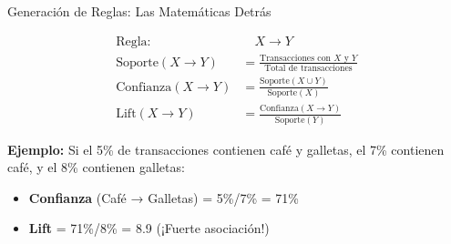 \documentclass{beamer}
\begin{document}
\begin{frame}{Generación de Reglas: Las Matemáticas Detrás}
    \centering
    \begin{tcolorbox}[
        width=0.9\textwidth,
        colback=blue!10!black,
        colframe=blue!50!black,
        coltext=white,
        arc=0mm,
        boxrule=0.5mm,
        title={\textbf{Ecuaciones Clave}}
    ]
    \begin{align*}
    \text{Regla:} & \quad X \rightarrow Y \\[0.5em]
    \text{Soporte}(X \rightarrow Y) &= \frac{\text{Transacciones con }X\text{ y }Y}{\text{Total de transacciones}} \\[0.5em]
    \text{Confianza}(X \rightarrow Y) &= \frac{\text{Soporte}(X \cup Y)}{\text{Soporte}(X)} \\[0.5em]
    \text{Lift}(X \rightarrow Y) &= \frac{\text{Confianza}(X \rightarrow Y)}{\text{Soporte}(Y)}
    \end{align*}
    \end{tcolorbox}
    
    \vspace{0.5em}
    \small
    \textbf{Ejemplo:} Si el 5\% de transacciones contienen café y galletas, el 7\% contienen café, y el 8\% contienen galletas:
    \begin{itemize}
        \item \textbf{Confianza} (Café → Galletas) = 5\%/7\% = 71\%
        \item \textbf{Lift} = 71\%/8\% = 8.9 (¡Fuerte asociación!)
    \end{itemize}
\end{frame}
\end{document}
